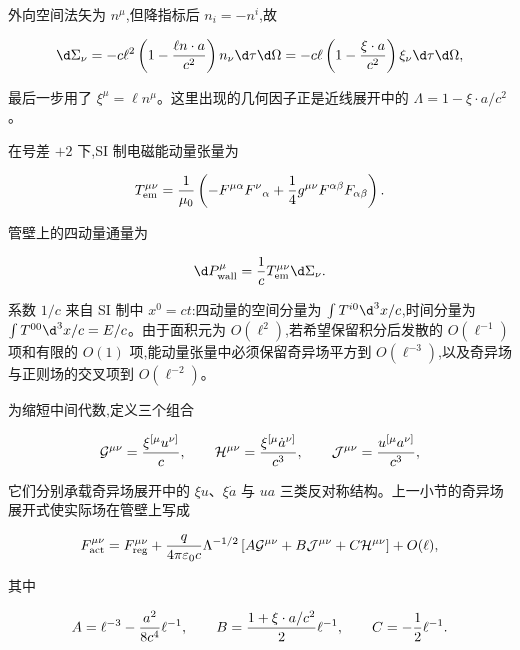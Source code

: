 外向空间法矢为 $n^\mu$,但降指标后 $n_i=-n^i$,故

\begin{equation*}
 \d\Sigma_\nu
 =-c\ell^2\left(1-{\ell n\cdot a\over c^2}\right)n_\nu\d\tau\d\Omega
 =-c\ell\left(1-{\xi\cdot a\over c^2}\right)\xi_\nu\d\tau\d\Omega,
\end{equation*}

最后一步用了 $\xi^\mu=\ell n^\mu$。这里出现的几何因子正是近线展开中的 $\Lambda=1-\xi\cdot a/c^2$。

在号差 $+2$ 下,SI 制电磁能动量张量为

\begin{equation*}
 T_{\mathrm{em}}^{\mu\nu}
 ={1\over\mu_0}
 \left(
 -F^{\mu\alpha}F^\nu{}_{\alpha}
 +{1\over4}g^{\mu\nu}F^{\alpha\beta}F_{\alpha\beta}
 \right).
\end{equation*}

管壁上的四动量通量为

\begin{equation*}
 \d P_{\mathrm{wall}}^\mu
 ={1\over c}T_{\mathrm{em}}^{\mu\nu}\d\Sigma_\nu.
\end{equation*}

系数 $1/c$ 来自 SI 制中 $x^0=ct$:四动量的空间分量为 $\int T^{i0}\d^3x/c$,时间分量为 $\int T^{00}\d^3x/c=E/c$。由于面积元为 $O(\ell^2)$,若希望保留积分后发散的 $O(\ell^{-1})$ 项和有限的 $O(1)$ 项,能动量张量中必须保留奇异场平方到 $O(\ell^{-3})$,以及奇异场与正则场的交叉项到 $O(\ell^{-2})$。

为缩短中间代数,定义三个组合

\begin{equation*}
 \mathcal G^{\mu\nu}={\xi^{[\mu}u^{\nu]}\over c},
 \qquad
 \mathcal H^{\mu\nu}={\xi^{[\mu}\dot a^{\nu]}\over c^3},
 \qquad
 \mathcal J^{\mu\nu}={u^{[\mu}a^{\nu]}\over c^3},
\end{equation*}

它们分别承载奇异场展开中的 $\xi u$、$\xi\dot a$ 与 $u a$ 三类反对称结构。上一小节的奇异场展开式使实际场在管壁上写成

\begin{equation*}
 F_{\mathrm{act}}^{\mu\nu}
 =F_{\mathrm{reg}}^{\mu\nu}
 +{q\over4\pi\varepsilon_0c}\Lambda^{-1/2}
 \left[
 A\mathcal G^{\mu\nu}
 +B\mathcal J^{\mu\nu}
 +C\mathcal H^{\mu\nu}
 \right]+O(\ell),
\end{equation*}

其中

\begin{equation*}
 A=\ell^{-3}-{a^2\over8c^4}\ell^{-1},
 \qquad
 B={1+\xi\cdot a/c^2\over2}\ell^{-1},
 \qquad
 C=-{1\over2}\ell^{-1}.
\end{equation*}

